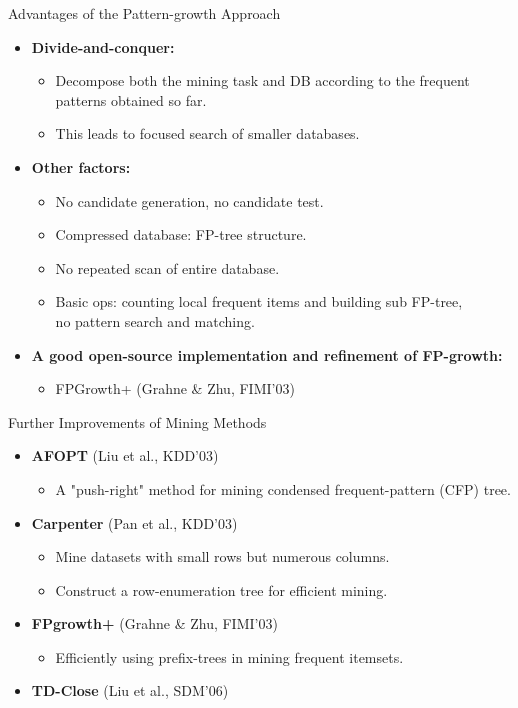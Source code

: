 \begin{frame}{Advantages of the Pattern-growth Approach}
	\begin{itemize}
		\item \textbf{Divide-and-conquer:}
		\begin{itemize}
			\item Decompose both the mining task and DB according
			to the frequent patterns obtained so far.
			\item This leads to focused search of smaller databases.
		\end{itemize}
		\item \textbf{Other factors:}
		\begin{itemize}
			\item No candidate generation, no candidate test.
			\item Compressed database: FP-tree structure.
			\item No repeated scan of entire database.
			\item Basic ops: counting local frequent items and building sub 
			FP-tree,\\
			no pattern search and matching.
		\end{itemize}
		\item \textbf{A good open-source implementation and refinement of 
		FP-growth:}
		\begin{itemize}
			\item FPGrowth+ (Grahne \& Zhu, FIMI'03)
		\end{itemize}
	\end{itemize}
\end{frame}

\begin{frame}{Further Improvements of Mining Methods}
	\begin{itemize}
		\item \textbf{AFOPT} (Liu et al., KDD'03)
		\begin{itemize}
			\item A "push-right" method for mining condensed frequent-pattern 
			(CFP) tree.
		\end{itemize}
		\item \textbf{Carpenter} (Pan et al., KDD'03)
		\begin{itemize}
			\item Mine datasets with small rows but numerous columns.
			\item Construct a row-enumeration tree for efficient mining.
		\end{itemize}
		\item \textbf{FPgrowth+} (Grahne \& Zhu, FIMI'03)
		\begin{itemize}
			\item Efficiently using prefix-trees in mining frequent itemsets.
		\end{itemize}
		\item \textbf{TD-Close} (Liu et al., SDM'06)
	\end{itemize}
\end{frame}

